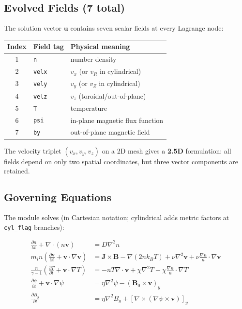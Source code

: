 \documentclass[11pt,letterpaper]{article}
\begin{document}
\subsection{Evolved Fields (7 total)}

The solution vector $\mathbf{u}$ contains seven scalar fields at every Lagrange
node:

\begin{center}
\begin{tabular}{cll}
\toprule
\textbf{Index} & \textbf{Field tag} & \textbf{Physical meaning} \\
\midrule
1 & \texttt{n} & number density \\
2 & \texttt{velx} & $v_x$ (or $v_R$ in cylindrical) \\
3 & \texttt{vely} & $v_y$ (or $v_Z$ in cylindrical) \\
4 & \texttt{velz} & $v_z$ (toroidal/out-of-plane) \\
5 & \texttt{T} & temperature \\
6 & \texttt{psi} & in-plane magnetic flux function \\
7 & \texttt{by} & out-of-plane magnetic field \\
\bottomrule
\end{tabular}
\end{center}

The velocity triplet $(v_x, v_y, v_z)$ on a 2D mesh gives a \textbf{2.5D}
formulation: all fields depend on only two spatial coordinates, but
three vector components are retained.

\subsection{Governing Equations}

The module solves (in Cartesian notation; cylindrical adds metric factors at
\texttt{cyl\_flag} branches):

\begin{align}
\frac{\partial n}{\partial t} + \nabla\cdot(n\mathbf{v}) &= D\nabla^2 n
\label{eq:continuity} \\
m_i n\left(\frac{\partial \mathbf{v}}{\partial t}
  + \mathbf{v}\cdot\nabla\mathbf{v}\right)
  &= \mathbf{J}\times\mathbf{B}
    - \nabla(2nk_BT)
    + \nu\nabla^2\mathbf{v}
    + \nu\frac{\nabla n}{n}\cdot\nabla\mathbf{v}
\label{eq:momentum} \\
\frac{n}{\gamma-1}\left(\frac{\partial T}{\partial t}
  + \mathbf{v}\cdot\nabla T\right)
  &= -nT\nabla\cdot\mathbf{v}
    + \chi\nabla^2 T
    - \chi\frac{\nabla n}{n}\cdot\nabla T
\label{eq:energy} \\
\frac{\partial\psi}{\partial t} + \mathbf{v}\cdot\nabla\psi
  &= \eta\nabla^2\psi - (\mathbf{B}_0\times\mathbf{v})_y
\label{eq:psi} \\
\frac{\partial B_y}{\partial t}
  &= \eta\nabla^2 B_y + [\nabla\times(\nabla\psi\times\mathbf{v})]_y
\label{eq:by}
\end{align}
\end{document}
